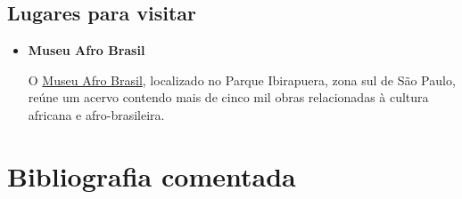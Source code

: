 \documentclass[12pt]{extarticle}
\begin{document}
\subsection{Lugares para visitar}

\begin{itemize}
\item\textbf{Museu Afro Brasil}


O \href{http://www.museuafrobrasil.org.br/}{Museu Afro Brasil}, localizado no Parque Ibirapuera, zona sul de São Paulo, reúne um
acervo contendo mais de cinco mil obras relacionadas à cultura africana e
afro-brasileira.
\end{itemize}

\section{Bibliografia comentada}
\end{document}
